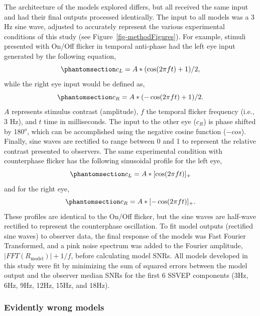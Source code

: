 \documentclass[
  12pt,
]{article}
\begin{document}
The architecture of the models explored differs, but all received the
same input and had their final outputs processed identically. The input
to all models was a 3 Hz sine wave, adjusted to accurately represent the
various experimental conditions of this study (see
Figure~\ref{fig-methodFigures}). For example, stimuli presented with
On/Off flicker in temporal anti-phase had the left eye input generated
by the following equation,
\begin{equation}\phantomsection\label{eq-stimInput2L}{
c_L = A * (\cos(2 \pi ft)+1)/2,
}\end{equation} while the right eye input would be defined as,
\begin{equation}\phantomsection\label{eq-stimInput2R}{
c_R = A * (-\cos(2 \pi ft)+1)/2.
}\end{equation} \(A\) represents stimulus contrast (amplitude), \(f\)
the temporal flicker frequency (i.e., 3 Hz), and \(t\) time in
milliseconds. The input to the other eye (\(c_R\)) is phase shifted by
180\(^o\), which can be accomplished using the negative cosine function
(\(-cos\)). Finally, sine waves are rectified to range between 0 and 1
to represent the relative contrast presented to observers. The same
experimental condition with counterphase flicker has the following
sinusoidal profile for the left eye,
\begin{equation}\phantomsection\label{eq-stimInput3L}{
c_L = A * [\cos(2 \pi ft)]_+
}\end{equation} and for the right eye,
\begin{equation}\phantomsection\label{eq-stimInput3R}{
c_R = A * [-\cos(2 \pi ft)]_+.
}\end{equation} These profiles are identical to the On/Off flicker, but
the sine waves are half-wave rectified to represent the counterphase
oscillation. To fit model outputs (rectified sine waves) to observer
data, the final response of the models was Fast Fourier Transformed, and
a pink noise spectrum was added to the Fourier amplitude,
\(|FFT(R_\text{model})|+1/f\), before calculating model SNRs. All models
developed in this study were fit by minimizing the sum of squared errors
between the model output and the observer median SNRs for the first 6
SSVEP components (3Hz, 6Hz, 9Hz, 12Hz, 15Hz, and 18Hz).

\subsubsection{Evidently wrong models}\label{evidently-wrong-models}
\end{document}
